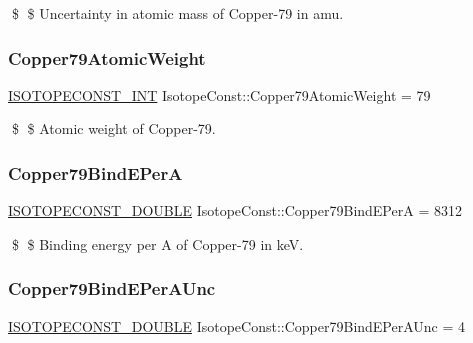 \$ \$ Uncertainty in atomic mass of Copper-\/79 in amu. \mbox{\label{group___isotope_const-_copper-_cu79_gac116c780af99e857c209accb988505ba}} 
\subsubsection{\texorpdfstring{Copper79\+Atomic\+Weight}{Copper79AtomicWeight}}
{\footnotesize\ttfamily \mbox{\hyperlink{group___isotope_const-_macros_ga5f18360b3e99483a35c32d789e62621c}{I\+S\+O\+T\+O\+P\+E\+C\+O\+N\+S\+T\+\_\+\+I\+NT}} Isotope\+Const\+::\+Copper79\+Atomic\+Weight = 79}

\$ \$ Atomic weight of Copper-\/79. \mbox{\label{group___isotope_const-_copper-_cu79_ga08b717986f3032a74b12fac29091ae81}} 
\subsubsection{\texorpdfstring{Copper79\+Bind\+E\+PerA}{Copper79BindEPerA}}
{\footnotesize\ttfamily \mbox{\hyperlink{group___isotope_const-_macros_ga8f45a7272ce02c0b4c65c44636ed719a}{I\+S\+O\+T\+O\+P\+E\+C\+O\+N\+S\+T\+\_\+\+D\+O\+U\+B\+LE}} Isotope\+Const\+::\+Copper79\+Bind\+E\+PerA = 8312}

\$ \$ Binding energy per A of Copper-\/79 in keV. \mbox{\label{group___isotope_const-_copper-_cu79_gadc6c028bf8555125ebc7696f44a04ec4}} 
\subsubsection{\texorpdfstring{Copper79\+Bind\+E\+Per\+A\+Unc}{Copper79BindEPerAUnc}}
{\footnotesize\ttfamily \mbox{\hyperlink{group___isotope_const-_macros_ga8f45a7272ce02c0b4c65c44636ed719a}{I\+S\+O\+T\+O\+P\+E\+C\+O\+N\+S\+T\+\_\+\+D\+O\+U\+B\+LE}} Isotope\+Const\+::\+Copper79\+Bind\+E\+Per\+A\+Unc = 4}

